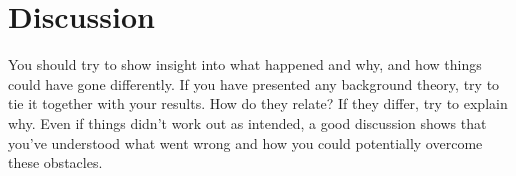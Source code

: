\section{Discussion}

You should try to show insight into what happened and why, and how things could have
gone differently. If you have presented any background theory, try to tie it together with
your results. How do they relate? If they differ, try to explain why. Even if things didn’t
work out as intended, a good discussion shows that you’ve understood what went wrong
and how you could potentially overcome these obstacles. 